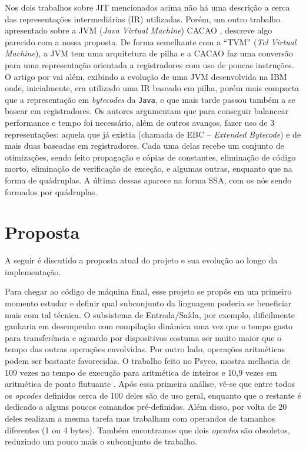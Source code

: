 Nos dois trabalhos sobre JIT mencionados acima não há uma descrição
a cerca das representações intermediárias (IR) utilizadas. Porém, um
outro trabalho
apresentado sobre a JVM (\textit{Java Virtual Machine}) CACAO \cite{cacao},
descreve algo parecido com a nossa proposta. De forma semelhante com a
``TVM'' (\textit{Tcl Virtual Machine}), a JVM tem uma arquitetura de
pilha e a CACAO faz uma conversão para uma representação orientada a
registradores com uso de poucas instruções. O artigo por
 vai além, exibindo a evolução de uma JVM
desenvolvida na IBM onde, inicialmente, era utilizado uma IR baseado
em pilha, porém mais compacta que a representação em \textit{bytecodes} da
\texttt{Java}, e que mais tarde passou também a se basear em
registradores. Os autores argumentam que para conseguir balancear
performance e tempo foi necessário, além de outros avanços, fazer uso
de 3 representações: aquela que já existia (chamada de EBC --
\textit{Extended Bytecode}) e de mais duas baseadas em
registradores. Cada uma delas recebe um conjunto de otimizações, sendo
feito propagação e cópias de constantes, eliminação de código morto,
eliminação de verificação de exceção, e algumas outras, enquanto que na
forma de quádruplas. A última dessas aparece na forma SSA, com os nós
sendo formados por quádruplas.


\section{Proposta}
\label{proposta}

A seguir é discutido a proposta atual do projeto e sua evolução ao
longo da implementação.

Para chegar ao código de máquina final, esse projeto se propôs em
um primeiro momento estudar e definir qual subconjunto da linguagem poderia
se beneficiar mais com tal técnica. O subsistema de Entrada/Saída, por
exemplo, dificilmente ganharia em desempenho com compilação dinâmica
uma vez que o tempo gasto para transferência e aguardo por dispositivos
costuma ser muito maior que o tempo das outras operações envolvidas.
Por outro lado, operações aritméticas podem ser bastante favorecidas.
O trabalho feito no Psyco, mostra melhoria
de 109 vezes no tempo de execução para aritmética de inteiros e 10,9
vezes em aritmética de ponto flutuante \cite{psyco}. Após essa
primeira análise, vê-se que entre todos os
\textit{opcodes} definidos cerca de 100 deles são de
uso geral, enquanto que o restante é dedicado a alguns poucos comandos
pré-definidos. Além disso, por volta de 20 deles realizam a mesma
tarefa mas trabalham com operandos de tamanhos diferentes (1 ou 4
bytes). Também encontramos que dois \textit{opcodes} são obsoletos,
reduzindo um pouco mais o subconjunto de trabalho.

